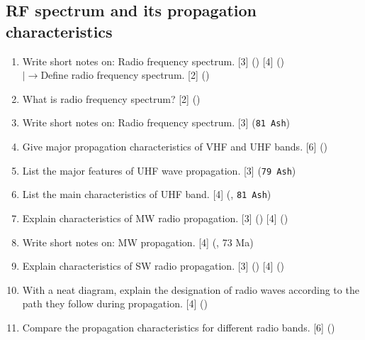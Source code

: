 \documentclass[12pt]{article}
\newcommand{\lb}{\\$\left|\rightarrow\right.$}
\begin{document}
  \subsection{RF spectrum and its propagation characteristics}
    \begin{enumerate}
      \item Write short notes on: Radio frequency spectrum. \hfill [3] () [4] ()
      \lb Define radio frequency spectrum. \hfill [2] ()

      \item What is radio frequency spectrum? \hfill [2] ()

      \item Write short notes on: Radio frequency spectrum. \hfill [3] (\texttt{81 Ash})

      \item Give major propagation characteristics of VHF and UHF bands. \hfill [6] ()
    
      \item List the major features of UHF wave propagation. \hfill [3] (\texttt{79 Ash})
    
      \item List the main characteristics of UHF band. \hfill [4] (, \texttt{81 Ash})

      \item Explain characteristics of MW radio propagation. \hfill [3] () [4] ()
      
      \item Write short notes on: MW propagation. \hfill [4] (, 73 Ma)

      \item Explain characteristics of SW radio propagation. \hfill [3] () [4] ()

      \item With a neat diagram, explain the designation of radio waves according to the path they follow during propagation. \hfill [4] ()

      \item Compare the propagation characteristics for different radio bands. \hfill [6] ()
    \end{enumerate}
\end{document}
